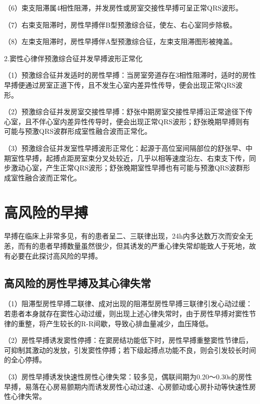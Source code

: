 （6）束支阻滞属4相性阻滞，并发房性或房室交接性早搏可呈正常QRS波形。

（7）右束支阻滞时，房性早搏伴B型预激综合征，使左、右心室同步除极。

（8）左束支阻滞时，房性早搏伴A型预激综合征，左束支阻滞图形被掩盖。

2.窦性心律伴预激综合征并发早搏波形正常化

（1）预激综合征并发适时的房性早搏：当房室旁道存在3相性阻滞时，适时的房性早搏便通过房室正道下传，且不发生心室内差异性传导，便会出现正常QRS波形。

（2）预激综合征并发房室交接性早搏：舒张中期房室交接性早搏沿正常途径下传心室，且不伴心室内差异性传导时，便会出现正常QRS波形；舒张晚期早搏则有可能与预激QRS波群形成室性融合波而正常化。

（3）预激综合征并发室性早搏波形正常化：起源于高位室间隔部位的舒张早、中期室性早搏，起搏点距房室束分叉处较近，几乎以相等速度沿左、右束支下传，同步激动心室，产生正常QRS波形；舒张晚期室性早搏也有可能与预激QRS波群形成室性融合波而正常化。

\protect\hypertarget{text00018.htmlux5cux23subid166}{}{}

\section{高风险的早搏}

早搏在临床上非常多见，有的患者呈二、三联律出现，24h内多达数万次而安全无恙，而有的患者早搏数量虽然很少，但其诱发的严重心律失常却能致人于死地，故有必要在此探讨高风险的早搏。

\protect\hypertarget{text00018.htmlux5cux23subid167}{}{}

\subsection{高风险的房性早搏及其心律失常}

（1）阻滞型房性早搏二联律、成对出现的阻滞型房性早搏三联律引发心动过缓：若患者本身就存在窦性心动过缓，则出现上述心律失常时，由于房性早搏对窦性节律的重整，将产生较长的R-R间歇，导致心排血量减少，血压降低。

（2）房性早搏诱发窦性停搏：在窦房结功能低下时，房性早搏重整窦性节律后，可抑制其激动的发放，引发窦性停搏；若下级起搏点功能不良，则会引发较长时间的全心停搏。

（3）房性早搏诱发快速性房性心律失常：较多见，偶联间期为0.20～0.30s的房性早搏，易落在心房易颤期内而诱发房性心动过速、心房颤动或心房扑动等快速性房性心律失常。

